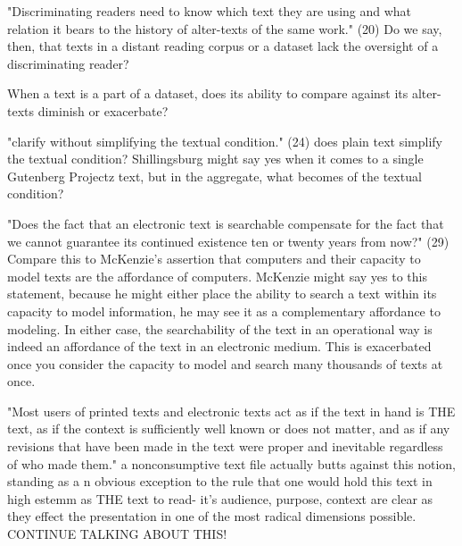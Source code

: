 \documentclass[course, english]{Notes}
\begin{document}
"Discriminating readers need to know which text they are using and what relation it bears to the history of alter-texts of the same work." (20)
	 {Do we say, then, that texts in a distant reading corpus or a dataset lack the oversight of a discriminating reader?} 
	 {When a text is a part of a dataset, does its ability to compare against its alter-texts diminish or exacerbate? 
	
"clarify without simplifying the textual condition." (24)
	 {does plain text simplify the textual condition? Shillingsburg might say yes when it comes to a single Gutenberg Projectz text, but in the aggregate, what becomes of the textual condition?} 
	
"Does the fact that an electronic text is searchable compensate for the fact that we cannot guarantee its continued existence ten or twenty years from now?" (29)
	 {Compare this to McKenzie's assertion that computers and their capacity to model texts are the affordance of computers. McKenzie might say yes to this statement, because he might either place the ability to search a text within its capacity to model information, he may see it as a complementary affordance to modeling. In either case, the searchability of the text in an  operational way is indeed an affordance of the text in an electronic medium. This is exacerbated once you consider the capacity to model and search many thousands of texts at once.} 

"Most users of printed texts and electronic texts act as if the text in hand is THE text, as if the context is sufficiently well known or does not matter, and as if any revisions that have been made in the text were proper and inevitable regardless of who made them."
	 {a nonconsumptive text file actually butts against this notion, standing as a n obvious exception to the rule that one would hold this text in high estemm as THE text to read- it's audience, purpose, context are clear as they effect the presentation in one of the most radical dimensions possible. CONTINUE TALKING ABOUT THIS!}
	
}
\end{document}
